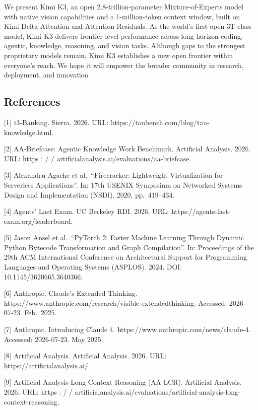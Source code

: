 \documentclass[
  10
]{article}
\begin{document}
We present Kimi K3, an open 2.8-trillion-parameter Mixture-of-Experts
model with native vision capabilities and a 1-million-token context
window, built on Kimi Delta Attention and Attention Residuals. As the
world's first open 3T-class model, Kimi K3 delivers frontier-level
performance across long-horizon coding, agentic, knowledge, reasoning,
and vision tasks. Although gaps to the strongest proprietary models
remain, Kimi K3 establishes a new open frontier within everyone's reach.
We hope it will empower the broader community in research, deployment,
and innovation

\subsection{References}\label{references}

{[}1{]} τ3-Banking. Sierra. 2026. URL:
https://taubench.com/blog/tau-knowledge.html.

{[}2{]} AA-Briefcase: Agentic Knowledge Work Benchmark. Artificial
Analysis. 2026. URL: https : / /
artificialanalysis.ai/evaluations/aa-briefcase.

{[}3{]} Alexandru Agache et al.~``Firecracker: Lightweight
Virtualization for Serverless Applications''. In: 17th USENIX Symposium
on Networked Systems Design and Implementation (NSDI). 2020,
pp.~419--434.

{[}4{]} Agents' Last Exam. UC Berkeley RDI. 2026. URL:
https://agents-last-exam.org/leaderboard.

{[}5{]} Jason Ansel et al.~``PyTorch 2: Faster Machine Learning Through
Dynamic Python Bytecode Transformation and Graph Compilation''. In:
Proceedings of the 29th ACM International Conference on Architectural
Support for Programming Languages and Operating Systems (ASPLOS). 2024.
DOI: 10.1145/3620665.3640366.

{[}6{]} Anthropic. Claude's Extended Thinking.
https://www.anthropic.com/research/visible-extendedthinking. Accessed:
2026-07-23. Feb.~2025.

{[}7{]} Anthropic. Introducing Claude 4.
https://www.anthropic.com/news/claude-4. Accessed: 2026-07-23. May 2025.

{[}8{]} Artificial Analysis. Artificial Analysis. 2026. URL:
https://artificialanalysis.ai/.

{[}9{]} Artificial Analysis Long Context Reasoning (AA-LCR). Artificial
Analysis. 2026. URL: https : / /
artificialanalysis.ai/evaluations/artificial-analysis-long-context-reasoning.
\end{document}
